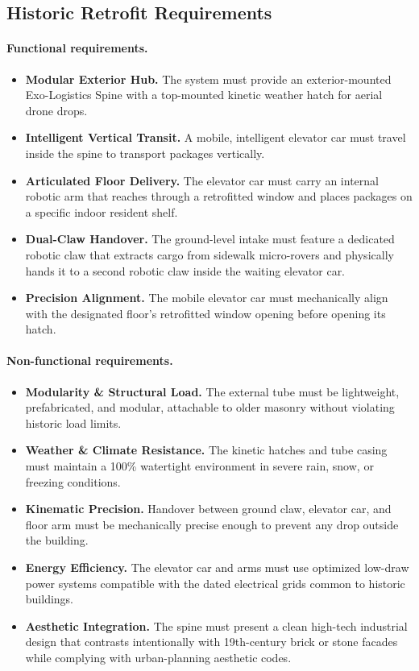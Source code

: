 \documentclass[11pt,a4paper]{report}
\begin{document}
\subsection{Historic Retrofit Requirements}
\label{ssec:req-retrofit}

\paragraph{Functional requirements.}
\begin{itemize}
    \item \textbf{Modular Exterior Hub.} The system must provide an
    exterior-mounted Exo-Logistics Spine with a top-mounted kinetic
    weather hatch for aerial drone drops.
    \item \textbf{Intelligent Vertical Transit.} A mobile, intelligent
    elevator car must travel inside the spine to transport packages
    vertically.
    \item \textbf{Articulated Floor Delivery.} The elevator car must
    carry an internal robotic arm that reaches through a retrofitted
    window and places packages on a specific indoor resident shelf.
    \item \textbf{Dual-Claw Handover.} The ground-level intake must
    feature a dedicated robotic claw that extracts cargo from sidewalk
    micro-rovers and physically hands it to a second robotic claw
    inside the waiting elevator car.
    \item \textbf{Precision Alignment.} The mobile elevator car must
    mechanically align with the designated floor's retrofitted window
    opening before opening its hatch.
\end{itemize}

\paragraph{Non-functional requirements.}
\begin{itemize}
    \item \textbf{Modularity \& Structural Load.} The external tube
    must be lightweight, prefabricated, and modular, attachable to
    older masonry without violating historic load limits.
    \item \textbf{Weather \& Climate Resistance.} The kinetic hatches
    and tube casing must maintain a 100\% watertight environment in
    severe rain, snow, or freezing conditions.
    \item \textbf{Kinematic Precision.} Handover between ground claw,
    elevator car, and floor arm must be mechanically precise enough to
    prevent any drop outside the building.
    \item \textbf{Energy Efficiency.} The elevator car and arms must
    use optimized low-draw power systems compatible with the dated
    electrical grids common to historic buildings.
    \item \textbf{Aesthetic Integration.} The spine must present a
    clean high-tech industrial design that contrasts intentionally
    with 19th-century brick or stone facades while complying with
    urban-planning aesthetic codes.
\end{itemize}
\end{document}
